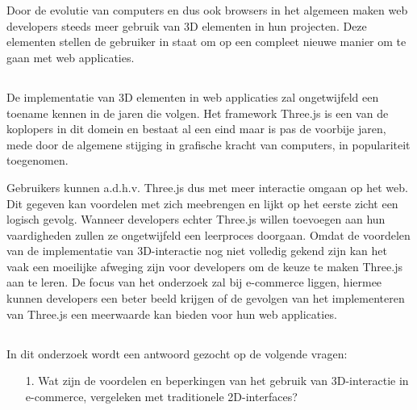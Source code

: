 
\chapter{}%
\label{ch:inleiding}

Door de evolutie van computers en dus ook browsers in het algemeen maken web developers steeds meer gebruik van 3D elementen in hun projecten. Deze elementen stellen de gebruiker in staat om op een compleet nieuwe manier om te gaan met web applicaties. 

\section{}%
\label{sec:probleemstelling}

De implementatie van 3D elementen in web applicaties zal ongetwijfeld een toename kennen in de jaren die volgen. Het framework Three.js is een van de koplopers in dit domein en bestaat al een eind maar is pas de voorbije jaren, mede door de algemene stijging in grafische kracht van computers, in populariteit toegenomen. 

Gebruikers kunnen a.d.h.v. Three.js dus met meer interactie omgaan op het web. Dit gegeven kan voordelen met zich meebrengen en lijkt op het eerste zicht een logisch gevolg. Wanneer developers echter Three.js willen toevoegen aan hun vaardigheden zullen ze ongetwijfeld een leerproces doorgaan. Omdat de voordelen van de implementatie van 3D-interactie nog niet volledig gekend zijn kan het vaak een moeilijke afweging zijn voor developers om de keuze te maken Three.js aan te leren. De focus van het onderzoek zal bij e-commerce liggen, hiermee kunnen developers een beter beeld krijgen of de gevolgen van het implementeren van Three.js een meerwaarde kan bieden voor hun web applicaties.

\section{}%
\label{sec:onderzoeksvraag}

In dit onderzoek wordt een antwoord gezocht op de volgende vragen:

\begin{itemize}
	\item[1.] Wat zijn de voordelen en beperkingen van het gebruik van 3D-interactie in e-commerce, vergeleken met traditionele 2D-interfaces?
	
\end{itemize}

